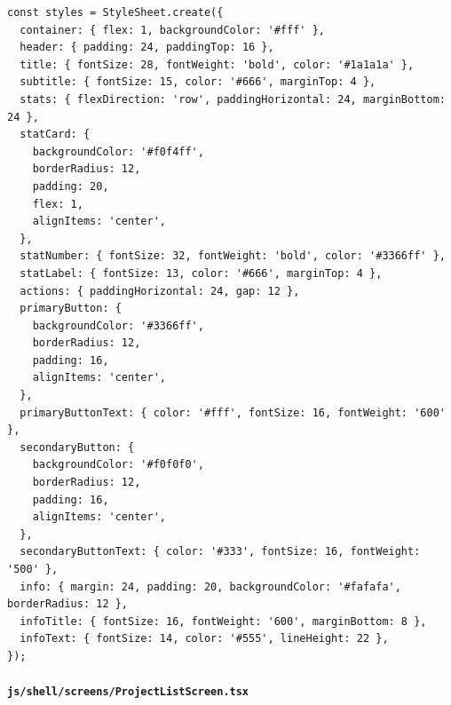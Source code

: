 \documentclass[11pt]{article}
\begin{document}
\begin{verbatim}
const styles = StyleSheet.create({
  container: { flex: 1, backgroundColor: '#fff' },
  header: { padding: 24, paddingTop: 16 },
  title: { fontSize: 28, fontWeight: 'bold', color: '#1a1a1a' },
  subtitle: { fontSize: 15, color: '#666', marginTop: 4 },
  stats: { flexDirection: 'row', paddingHorizontal: 24, marginBottom: 24 },
  statCard: {
    backgroundColor: '#f0f4ff',
    borderRadius: 12,
    padding: 20,
    flex: 1,
    alignItems: 'center',
  },
  statNumber: { fontSize: 32, fontWeight: 'bold', color: '#3366ff' },
  statLabel: { fontSize: 13, color: '#666', marginTop: 4 },
  actions: { paddingHorizontal: 24, gap: 12 },
  primaryButton: {
    backgroundColor: '#3366ff',
    borderRadius: 12,
    padding: 16,
    alignItems: 'center',
  },
  primaryButtonText: { color: '#fff', fontSize: 16, fontWeight: '600' },
  secondaryButton: {
    backgroundColor: '#f0f0f0',
    borderRadius: 12,
    padding: 16,
    alignItems: 'center',
  },
  secondaryButtonText: { color: '#333', fontSize: 16, fontWeight: '500' },
  info: { margin: 24, padding: 20, backgroundColor: '#fafafa', borderRadius: 12 },
  infoTitle: { fontSize: 16, fontWeight: '600', marginBottom: 8 },
  infoText: { fontSize: 14, color: '#555', lineHeight: 22 },
});
\end{verbatim}

\paragraph{\texttt{js/shell/screens/ProjectListScreen.tsx}}
\end{document}
